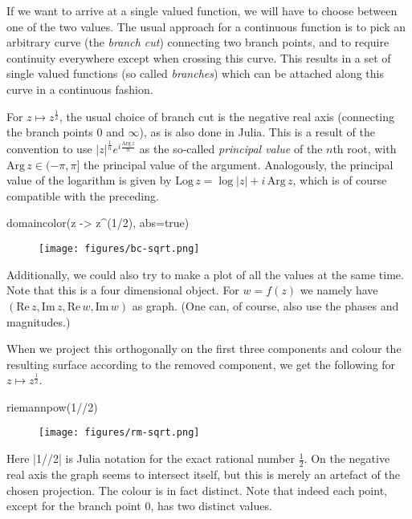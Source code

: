 \documentclass[a4paper]{article}
\begin{document}
If we want to arrive at a single valued function, we will have to choose between
one of the two values. The usual approach for a continuous function is to pick
an arbitrary curve (the \emph{branch cut}) connecting two branch points, and to
require continuity everywhere except when crossing this curve. This results in a
set of single valued functions (so called \emph{branches}) which can be attached
along this curve in a continuous fashion.

For $z \mapsto z^\frac{1}{2}$, the usual choice of branch cut is the negative
real axis (connecting the branch points $0$ and $\infty$), as is also done in
Julia. This is a result of the convention to use
${|z|}^{\frac{1}{n}} e^{i \frac{\mathrm{Arg}\,z}{n}}$ as the so-called
\emph{principal value} of the $n$th root, with $\mathrm{Arg}\,z \in (-\pi, \pi]$
the principal value of the argument. Analogously, the principal value of the
logarithm is given by $\mathrm{Log}\,z = \log |z| + i\,\mathrm{Arg}\, z$, which
is of course compatible with the preceding.

\begin{juliaverbatim}
	domaincolor(z -> z^(1/2), abs=true)
\end{juliaverbatim}
\begin{figure}[H]
	\centering
	\texttt{[image: figures/bc-sqrt.png]}
\end{figure}

Additionally, we could also try to make a plot of all the values at the same
time. Note that this is a four dimensional object. For $w = f(z)$ we namely have
$(\mathrm{Re}\,z, \mathrm{Im}\,z, \mathrm{Re}\,w, \mathrm{Im}\,w)$ as
graph. (One can, of course, also use the phases and magnitudes.)

When we project this orthogonally on the first three components and colour
the resulting surface according to the removed component, we get the
following for $z \mapsto z^{\frac{1}{2}}$.

\begin{juliaverbatim}
	riemannpow(1//2)
\end{juliaverbatim}
\begin{figure}[H]
	\centering
	\texttt{[image: figures/rm-sqrt.png]}
\end{figure}

Here \jlv|1//2| is Julia notation for the exact rational number
$\frac{1}{2}$. On the negative real axis the graph seems to intersect itself,
but this is merely an artefact of the chosen projection. The colour is in fact
distinct. Note that indeed each point, except for the branch point $0$, has two
distinct values.
\end{document}
